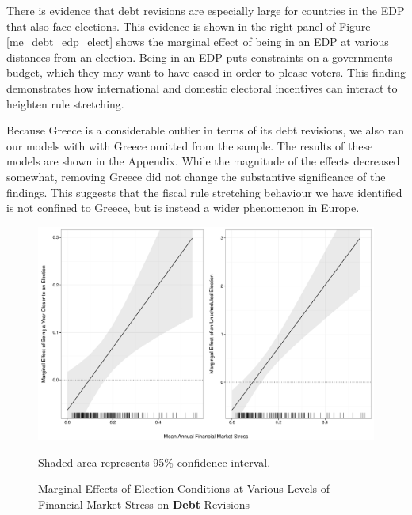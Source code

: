 \documentclass[]{article}
\begin{document}
There is evidence that debt revisions are especially large for countries in the EDP that also face elections. This evidence is shown in the right-panel of Figure \ref{me_debt_edp_elect} shows the marginal effect of being in an EDP at various distances from an election. Being in an EDP puts constraints on a governments budget, which they may want to have eased in order to please voters. This finding demonstrates how international and domestic electoral incentives can interact to heighten rule stretching.

Because Greece is a considerable outlier in terms of its debt revisions, we also ran our models with with Greece omitted from the sample. The results of these models are shown in the Appendix. While the magnitude of the effects decreased somewhat, removing Greece did not change the substantive significance of the findings. This suggests that the fiscal rule stretching behaviour we have identified is not confined to Greece, but is instead a wider phenomenon in Europe.


\begin{figure}
    \caption{Marginal Effects of Election Conditions at Various Levels of Financial Market Stress on \textbf{Debt} Revisions}
    \label{me_finstress_elect}

    \begin{center}
        \includegraphics[scale=0.45]{figures/fsi_elect_me.pdf}
    \end{center}

	{\scriptsize{Shaded area represents 95\% confidence interval.}}

\end{figure}
\end{document}
